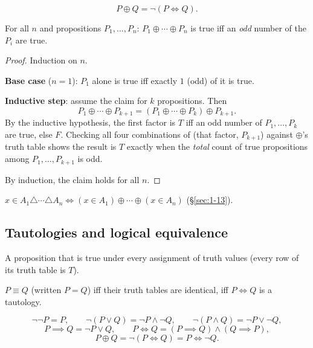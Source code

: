 \documentclass[11pt]{article}
\begin{document}
\begin{theorem}
\[
P \oplus Q = \neg(P \iff Q).
\]
\end{theorem}

\bigskip
\begin{theorem}
For all $n$ and propositions $P_1,\dots,P_n$: $P_1\oplus\cdots\oplus P_n$ is true iff an \emph{odd} number of the $P_i$ are true.
\end{theorem}
\begin{proof}
Induction on $n$.

\medskip
\textbf{Base case} ($n=1$): $P_1$ alone is true iff exactly $1$ (odd) of it is true.

\medskip
\textbf{Inductive step}: assume the claim for $k$ propositions. Then
\[
P_1\oplus\cdots\oplus P_{k+1} = (P_1\oplus\cdots\oplus P_k) \oplus P_{k+1}.
\]
By the inductive hypothesis, the first factor is $T$ iff an odd number of $P_1,\dots,P_k$ are true, else $F$. Checking all four combinations of (that factor, $P_{k+1}$) against $\oplus$'s truth table shows the result is $T$ exactly when the \emph{total} count of true propositions among $P_1,\dots,P_{k+1}$ is odd.

\medskip
By induction, the claim holds for all $n$.
\end{proof}

\begin{note}
$x \in A_1 \triangle \cdots \triangle A_n \iff (x\in A_1)\oplus\cdots\oplus(x\in A_n)$ (\S\ref{sec:1-13}).
\end{note}

\subsection{Tautologies and logical equivalence}
\label{sec:4-12}

\begin{definition}[Tautology]
A proposition that is true under every assignment of truth values (every row of its truth table is $T$).
\end{definition}

\begin{definition}
$P \equiv Q$ (written $P=Q$) iff their truth tables are identical, iff $P\iff Q$ is a tautology.
\end{definition}

\begin{note}
\[
\neg\neg P = P, \qquad \neg(P\vee Q)=\neg P\wedge\neg Q, \qquad \neg(P\wedge Q)=\neg P\vee\neg Q,
\]
\[
P\implies Q = \neg P \vee Q, \qquad P\iff Q = (P\implies Q)\wedge(Q\implies P),
\]
\[
P\oplus Q = \neg(P\iff Q) = P \iff \neg Q.
\]
\end{note}
\end{document}
